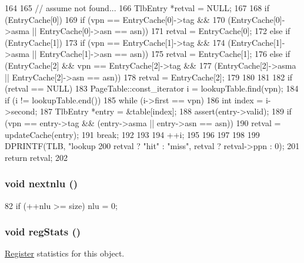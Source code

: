 \begin{DoxyCode}
164 {
165     // assume not found...
166     TlbEntry *retval = NULL;
167 
168     if (EntryCache[0]) {
169         if (vpn == EntryCache[0]->tag &&
170             (EntryCache[0]->asma || EntryCache[0]->asn == asn))
171             retval = EntryCache[0];
172         else if (EntryCache[1]) {
173             if (vpn == EntryCache[1]->tag &&
174                 (EntryCache[1]->asma || EntryCache[1]->asn == asn))
175                 retval = EntryCache[1];
176             else if (EntryCache[2] && vpn == EntryCache[2]->tag &&
177                      (EntryCache[2]->asma || EntryCache[2]->asn == asn))
178                 retval = EntryCache[2];
179         }
180     }
181 
182     if (retval == NULL) {
183         PageTable::const_iterator i = lookupTable.find(vpn);
184         if (i != lookupTable.end()) {
185             while (i->first == vpn) {
186                 int index = i->second;
187                 TlbEntry *entry = &table[index];
188                 assert(entry->valid);
189                 if (vpn == entry->tag && (entry->asma || entry->asn == asn)) {
190                     retval = updateCache(entry);
191                     break;
192                 }
193 
194                 ++i;
195             }
196         }
197     }
198 
199     DPRINTF(TLB, "lookup %
200             retval ? "hit" : "miss", retval ? retval->ppn : 0);
201     return retval;
202 }
\end{DoxyCode}
\hypertarget{classAlphaISA_1_1TLB_aeb5ba263cf2621ed26767046ab78a1dc}{
\subsubsection[{nextnlu}]{\setlength{\rightskip}{0pt plus 5cm}void nextnlu ()}}
\label{classAlphaISA_1_1TLB_aeb5ba263cf2621ed26767046ab78a1dc}



\begin{DoxyCode}
82 { if (++nlu >= size) nlu = 0; }
\end{DoxyCode}
\hypertarget{classAlphaISA_1_1TLB_a4dc637449366fcdfc4e764cdf12d9b11}{
\subsubsection[{regStats}]{\setlength{\rightskip}{0pt plus 5cm}void regStats ()}}
\label{classAlphaISA_1_1TLB_a4dc637449366fcdfc4e764cdf12d9b11}
\hyperlink{classRegister}{Register} statistics for this object. 


